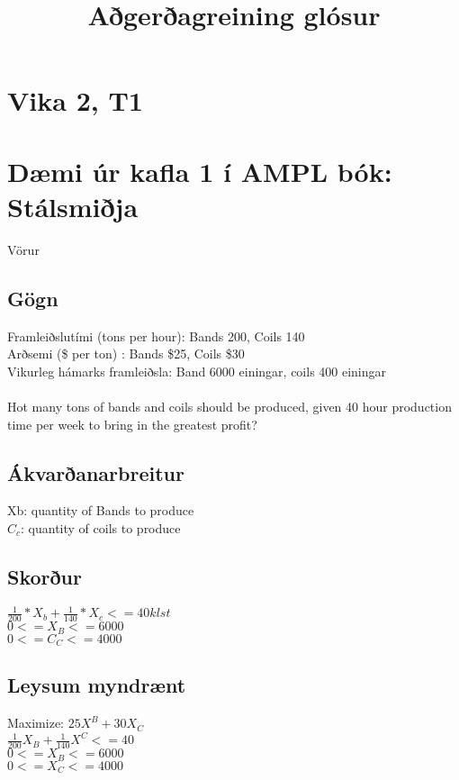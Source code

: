 \documentclass[]{article}
\begin{document}
\title{Aðgerðagreining glósur}
\maketitle

\section*{Vika 2, T1}

\section*{Dæmi úr kafla 1 í AMPL bók: Stálsmiðja}

Vörur

\subsection*{Gögn}
Framleiðslutími (tons per hour): Bands 200, Coils 140\\
Arðsemi (\$ per ton) : Bands \$25, Coils \$30 \\
Vikurleg hámarks framleiðsla: Band 6000 einingar, coils 400 einingar \\
\\
Hot many tons of bands and coils should be produced, given 40 hour production time per week to bring in the greatest profit?
\subsection*{Ákvarðanarbreitur}
Xb: quantity of Bands to produce \\
$C_{c}$: quantity of coils to produce \\

\subsection*{Skorður}

$ \frac{1}{200} * X_{b} + \frac{1}{140}*X_{c} <= 40 klst $ \\
$0 <= X_{B} <= 6000$\\
$0 <= C_{C} <= 4000$\\

\subsection*{Leysum myndrænt}
Maximize: $25X^{B} + 30X_{C}$ \\
$\frac{1}{200}X_{B} + \frac{1}{140}X^{C}<=40$ \\
$0 <= X_{B} <= 6000$ \\
$0 <= X_{C} <= 4000$ \\
\end{document}
